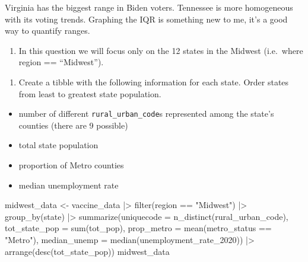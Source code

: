 \documentclass[
  letterpaper,
  DIV=11,
  numbers=noendperiod]{scrartcl}
\newenvironment{Shaded}{\begin{snugshade}}{\end{snugshade}}
\newcommand{\AttributeTok}[1]{\textcolor[rgb]{0.40,0.45,0.13}{#1}}
\newcommand{\FunctionTok}[1]{\textcolor[rgb]{0.28,0.35,0.67}{#1}}
\newcommand{\NormalTok}[1]{\textcolor[rgb]{0.00,0.23,0.31}{#1}}
\newcommand{\OtherTok}[1]{\textcolor[rgb]{0.00,0.23,0.31}{#1}}
\newcommand{\SpecialCharTok}[1]{\textcolor[rgb]{0.37,0.37,0.37}{#1}}
\newcommand{\StringTok}[1]{\textcolor[rgb]{0.13,0.47,0.30}{#1}}
\providecommand{\tightlist}{%
  \setlength{\itemsep}{0pt}\setlength{\parskip}{0pt}}
\begin{document}
Virginia has the biggest range in Biden voters. Tennessee is more
homogeneous with its voting trends. Graphing the IQR is something new to
me, it's a good way to quantify ranges.

\begin{enumerate}
\def\labelenumi{\arabic{enumi}.}
\setcounter{enumi}{5}
\tightlist
\item
  In this question we will focus only on the 12 states in the Midwest
  (i.e.~where region == ``Midwest'').
\end{enumerate}

\begin{enumerate}
\def\labelenumi{\alph{enumi})}
\tightlist
\item
  Create a tibble with the following information for each state. Order
  states from least to greatest state population.
\end{enumerate}

\begin{itemize}
\tightlist
\item
  number of different \texttt{rural\_urban\_code}s represented among the
  state's counties (there are 9 possible)
\item
  total state population
\item
  proportion of Metro counties
\item
  median unemployment rate
\end{itemize}

\begin{Shaded}
\begin{Highlighting}[]
\NormalTok{midwest\_data }\OtherTok{\textless{}{-}}\NormalTok{ vaccine\_data }\SpecialCharTok{|\textgreater{}}
  \FunctionTok{filter}\NormalTok{(region }\SpecialCharTok{==} \StringTok{"Midwest"}\NormalTok{) }\SpecialCharTok{|\textgreater{}}
  \FunctionTok{group\_by}\NormalTok{(state) }\SpecialCharTok{|\textgreater{}}
  \FunctionTok{summarize}\NormalTok{(}\AttributeTok{uniquecode =} \FunctionTok{n\_distinct}\NormalTok{(rural\_urban\_code),}
            \AttributeTok{tot\_state\_pop =} \FunctionTok{sum}\NormalTok{(tot\_pop),}
            \AttributeTok{prop\_metro =} \FunctionTok{mean}\NormalTok{(metro\_status }\SpecialCharTok{==} \StringTok{"Metro"}\NormalTok{), }
            \AttributeTok{median\_unemp =} \FunctionTok{median}\NormalTok{(unemployment\_rate\_2020)) }\SpecialCharTok{|\textgreater{}}
  \FunctionTok{arrange}\NormalTok{(}\FunctionTok{desc}\NormalTok{(tot\_state\_pop))}
\NormalTok{midwest\_data}
\end{Highlighting}
\end{Shaded}
\end{document}

